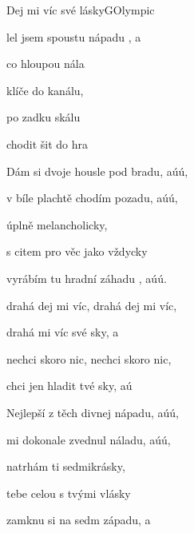\begin{song}{Dej mi víc své lásky}{G}{Olympic}

\begin{SBVerse}

lel jsem spoustu nápadu , a

co  hloupou nála

 klíče do kanálu,

 po zadku  skálu

 chodit šit do hra

\end{SBVerse}

\begin{SBVerse}

Dám si dvoje housle pod bradu, aúú,

v bíle plachtě chodím pozadu, aúú,

úplně melancholicky,

s citem pro věc jako vždycky

vyrábím tu hradní záhadu , aúú.

\end{SBVerse}

\begin{SBChorus}

 drahá dej mi víc,  drahá dej mi víc,

 drahá  mi víc své sky, a

 nechci skoro nic, nechci skoro nic,

 chci jen hladit tvé sky, aú

\end{SBChorus}

\begin{SBVerse}

Nejlepší z těch divnej nápadu, aúú,

mi dokonale zvednul náladu, aúú,

natrhám ti sedmikrásky,

tebe celou s tvými vlásky

zamknu si na sedm západu, a

\end{SBVerse}

\begin{SBChorus}

\end{SBChorus}

\end{song}

\clearpage
